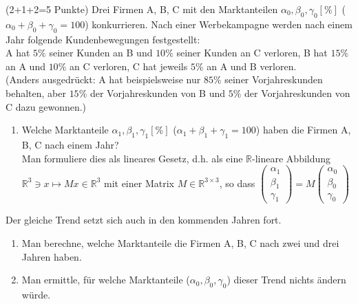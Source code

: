 \documentclass{uebblatt}
\begin{document}
\begin{aufgabe}{ (2+1+2=5 Punkte)}
Drei Firmen A, B, C mit den Marktanteilen $\alpha_0, \beta_0, \gamma_0[\%]$ ($\alpha_0 + \beta_0 + \gamma_0 = 100$) konkurrieren. Nach einer Werbekampagne werden nach einem Jahr folgende Kundenbewegungen festgestellt:\\
A hat $5\%$ seiner Kunden an B und $10\%$ seiner Kunden an C verloren, B hat $15\%$ an A und $10\%$ an C verloren, C hat jeweils $5\%$ an A und B verloren.\\
(Anders ausgedrückt: A hat beispielsweise nur $85\%$ seiner Vorjahreskunden behalten, aber $15\%$ der Vorjahreskunden von B und $5\%$ der Vorjahreskunden von C dazu gewonnen.)
\begin{enumerate}
\item Welche Marktanteile $\alpha_1, \beta_1, \gamma_1 [\%]$ ($\alpha_1 + \beta_1 + \gamma_1 = 100$) haben die Firmen A, B, C nach einem Jahr? \\
Man formuliere dies als lineares Gesetz, d.h. als eine $\mathbb{R}$-lineare Abbildung\break $\mathbb{R}^3 \ni x \mapsto Mx \in \mathbb{R}^3$ mit einer Matrix $M \in \mathbb{R}^{3 \times 3}$, so dass $\begin{pmatrix}\alpha_1\\\beta_1\\\gamma_1\end{pmatrix} = M \begin{pmatrix}\alpha_0\\\beta_0\\\gamma_0\end{pmatrix}$
\end{enumerate}
Der gleiche Trend setzt sich auch in den kommenden Jahren fort.
\begin{enumerate}[resume]
\item Man berechne, welche Marktanteile die Firmen A, B, C nach zwei und drei Jahren haben.
\item Man ermittle, für welche Marktanteile ($\alpha_0, \beta_0, \gamma_0$) dieser Trend nichts ändern würde.
\end{enumerate}
\end{aufgabe}
\end{document}
